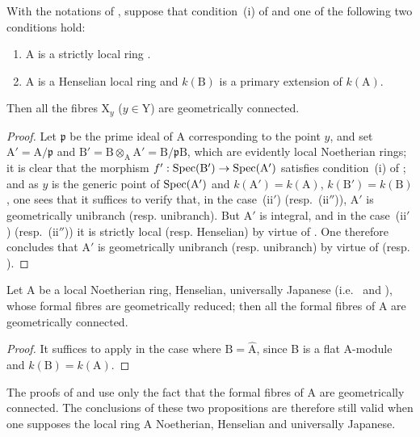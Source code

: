 \begin{corollary}[18.9.8]
\label{IV.18.9.8}
With the notations of , suppose that condition~(i) of  and one of the following two conditions hold:
\begin{enumerate}
  \item[\rm(ii$'$)] A is a strictly local ring .
  \item[\rm(ii$''$)] A is a Henselian local ring and $k(\mathrm{B})$ is a primary extension of $k(\mathrm{A})$.
\end{enumerate}
Then all the fibres $\mathrm{X}_y$ ($y\in\mathrm{Y}$) are geometrically connected.
\end{corollary}

\begin{proof}
Let $\mathfrak{p}$ be the prime ideal of A corresponding to the point $y$, and set $\mathrm{A}'=\mathrm{A}/\mathfrak{p}$ and $\mathrm{B}'=\mathrm{B}\otimes_{\mathrm{A}}\mathrm{A}'=\mathrm{B}/\mathfrak{p}\mathrm{B}$, which are evidently local Noetherian rings;
it is clear that the morphism $f':\operatorname{Spec}(\mathrm{B}')\to\operatorname{Spec}(\mathrm{A}')$ satisfies condition~(i) of ;
and as $y$ is the generic point of $\operatorname{Spec}(\mathrm{A}')$ and $k(\mathrm{A}')=k(\mathrm{A})$, $k(\mathrm{B}')=k(\mathrm{B})$, one sees that it suffices to verify that, in the case~(ii$'$) (resp.~(ii$''$)), $\mathrm{A}'$ is geometrically unibranch (resp. unibranch).
But $\mathrm{A}'$ is integral, and in the case~(ii$'$) (resp.~(ii$''$)) it is strictly local (resp. Henselian) by virtue of .
One therefore concludes that $\mathrm{A}'$ is geometrically unibranch (resp. unibranch) by virtue of  (resp. ).
\end{proof}

\begin{corollary}[18.9.9]
\label{IV.18.9.9}
Let $\mathrm{A}$ be a local Noetherian ring, Henselian, universally Japanese (i.e.~ and ), whose formal fibres  are geometrically reduced;
then all the formal fibres of A are geometrically connected.
\end{corollary}

\begin{proof}
It suffices to apply  in the case where $\mathrm{B}=\hat{\mathrm{A}}$, since B is a flat A-module and $k(\mathrm{B})=k(\mathrm{A})$.
\end{proof}

\begin{remark}[18.9.10]
\label{IV.18.9.10}
The proofs of  and  use only the fact that the formal fibres of A are geometrically connected.
The conclusions
of these two propositions are therefore still valid when one supposes the local ring A Noetherian, Henselian and universally Japanese.
\end{remark}

